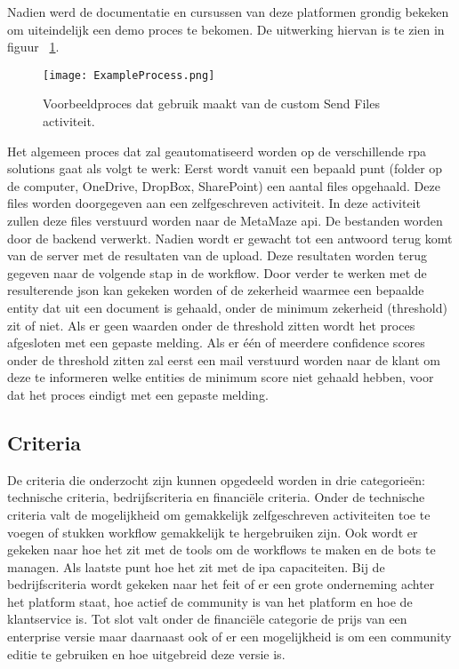  Nadien werd de documentatie en cursussen van deze platformen grondig bekeken om uiteindelijk een demo proces te bekomen. De uitwerking hiervan is te zien in figuur ~\ref{fig:exampleProcess}.

\begin{figure}[h]
	\texttt{[image: ExampleProcess.png]}
	\caption[Te automatiseren demoproces]{Voorbeeldproces dat gebruik maakt van de custom Send Files \gls{activiteit}.}
	\label{fig:exampleProcess}
\end{figure}

Het algemeen proces dat zal geautomatiseerd worden op de verschillende \acrshort{rpa} solutions gaat als volgt te werk: Eerst wordt vanuit een bepaald punt (folder op de computer, OneDrive, DropBox, SharePoint) een aantal files opgehaald. Deze files worden doorgegeven aan een zelfgeschreven \gls{activiteit}. In deze \gls{activiteit} zullen deze files verstuurd worden naar de MetaMaze \acrshort{api}. De bestanden worden door de backend verwerkt. Nadien wordt er gewacht tot een antwoord terug komt van de server met de resultaten van de upload. Deze resultaten worden terug gegeven naar de volgende stap in de \gls{workflow}. Door verder te werken met de resulterende \acrshort{json} kan gekeken worden of de zekerheid waarmee een bepaalde entity dat uit een document is gehaald, onder de minimum zekerheid (threshold) zit of niet. Als er geen waarden onder de threshold zitten wordt het proces afgesloten met een gepaste melding. Als er één of meerdere confidence scores onder de threshold zitten zal eerst een mail verstuurd worden naar de klant om deze te informeren welke entities de minimum score niet gehaald hebben, voor dat het proces eindigt met een gepaste melding.

\subsection{Criteria}
De criteria die onderzocht zijn kunnen opgedeeld worden in drie categorieën: technische criteria, bedrijfscriteria en financiële criteria. Onder de technische criteria valt de mogelijkheid om gemakkelijk zelfgeschreven \gls{activiteit}en toe te voegen of stukken \gls{workflow} gemakkelijk te hergebruiken zijn. Ook wordt er gekeken naar hoe het zit met de tools om de \gls{workflow}s te maken en de bots te managen. Als laatste punt hoe het zit met de \acrshort{ipa} capaciteiten. Bij de bedrijfscriteria wordt gekeken naar het feit of er een grote onderneming achter het platform staat, hoe actief de community is van het platform en hoe de klantservice is. Tot slot valt onder de financiële categorie de prijs van een enterprise versie maar daarnaast ook of er een mogelijkheid is om een community editie te gebruiken en hoe uitgebreid deze versie is.

